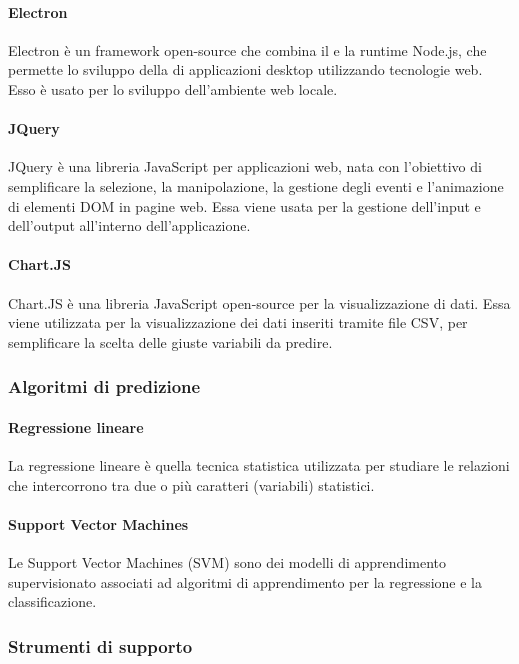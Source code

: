 \documentclass[../manuale-sviluppatore.tex]{subfiles}
\begin{document}
\paragraph{Electron}
Electron è un framework open-source che combina il   e la runtime Node.js, che permette lo sviluppo della  di applicazioni desktop utilizzando tecnologie web. Esso è usato per lo sviluppo dell'ambiente web locale.

\paragraph{JQuery}
JQuery è una libreria JavaScript per applicazioni web, nata con l'obiettivo di semplificare la selezione, la manipolazione, la gestione degli eventi e l'animazione di elementi DOM in pagine web. Essa viene usata per la gestione dell'input e dell'output all'interno dell'applicazione.

\paragraph{Chart.JS}
Chart.JS è una libreria JavaScript open-source per la visualizzazione di dati. Essa viene utilizzata per la visualizzazione dei dati inseriti tramite file CSV, per semplificare la scelta delle giuste variabili da predire.

\subsubsection{Algoritmi di predizione}
\paragraph{Regressione lineare}
La regressione lineare è quella tecnica statistica utilizzata per studiare le relazioni che intercorrono tra due o più caratteri (variabili) statistici.

\paragraph{Support Vector Machines}
Le Support Vector Machines (SVM) sono dei modelli di apprendimento supervisionato associati ad algoritmi di apprendimento per la regressione e la classificazione.

\subsubsection{Strumenti di supporto}
\end{document}
